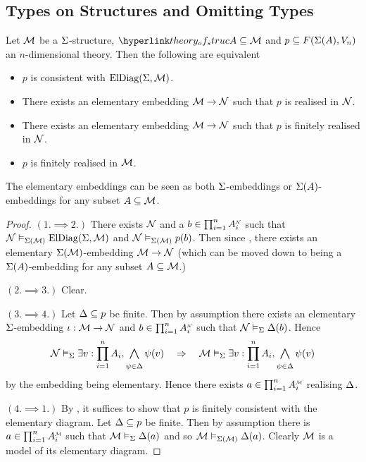 \subsection{Types on Structures and Omitting Types}

\begin{lem} 
    Let $\mathcal{M}$ be a $\Sigma$-structure, 
    $\linkto{theory_of_struc}{A \subs \MM}$ and $p \subseteq F(\Sigma(A),V_n)$
    an $n$-dimensional theory.
    Then the following are equivalent 
    \begin{itemize}
        \item $p$ is consistent with $\mathrm{ElDiag}(\Sigma,\mathcal{M})$.
        \item There exists an elementary embedding $\mathcal{M} \to \mathcal{N}$ 
            such that $p$ is realised in $\mathcal{N}$.
        \item There exists an elementary embedding $\mathcal{M} \to \mathcal{N}$ 
            such that $p$ is finitely realised in $\mathcal{N}$.
        \item $p$ is finitely realised in $\mathcal{M}$.
    \end{itemize}
    The elementary embeddings can be seen as both $\Sigma$-embeddings or 
    $\Sigma(A)$-embeddings for any subset $A \subseteq \mathcal{M}$.
\end{lem}
\begin{proof}
    $(1. \implies 2.)$ There exists $\mathcal{N}$ and a
    $b \in \prod_{i = 1}^n \nnintp{A_i}$ such that 
    $\mathcal{N} \vDash_{\Sigma(\mathcal{M})} \mathrm{ElDiag}(\Sigma,\mathcal{M})$ and 
    $\mathcal{N} \vDash_{\Sigma(\mathcal{M})} p(b)$.
    Then since , 
    there exists an elementary $\Sigma(\mathcal{M})$-embedding $\mathcal{M} \to \mathcal{N}$
    (which can be moved down to being a $\Sigma(A)$-embedding for any 
    subset $A \subseteq \mathcal{M}$.) 

    $(2. \implies 3.)$ Clear.

    $(3. \implies 4.)$ Let $\Delta \subseteq p$ be finite.
    Then by assumption there exists an elementary $\Sigma$-embedding 
    $\iota : \mathcal{M} \to \mathcal{N}$ and $b \in \prod_{i = 1}^n \nnintp{A_i}$ 
    such that  
    $\mathcal{N} \vDash_{\Sigma} \Delta(b)$. 
    Hence 
    \[
        \NN \modelsi \exists v : \prod_{i = 1}^n A_i, 
        \bigand{\psi \in \De}{} \psi(v) 
        \quad \implies \quad 
        \MM \modelsi \exists v : \prod_{i = 1}^n A_i, 
        \bigand{\psi \in \De}{} \psi(v)
    \]
    by the embedding being elementary. 
    Hence there exists $a \in \prod_{i = 1}^n \mmintp{A_i}$ 
    realising $\Delta$.

    $(4. \implies 1.)$
        By ,
        it suffices to show that $p$ 
        is finitely consistent with the elementary diagram.
        Let $\Delta \subseteq p$ be finite.
        Then by assumption there is $a \in \prod_{i=1}^n \mmintp{A_i}$ such that 
        $\mathcal{M} \vDash_{\Sigma} \Delta(a)$ and so $\mathcal{M} \vDash_{\Sigma(\mathcal{M})} \Delta(a)$.
        Clearly $\mathcal{M}$ is a model of its elementary diagram.
\end{proof}

